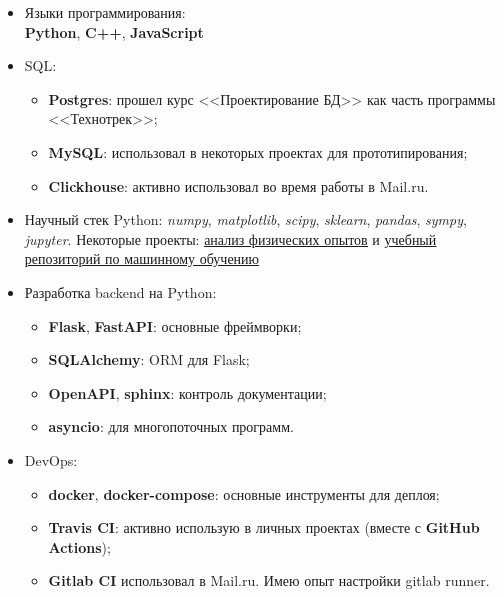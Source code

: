 \begin{itemize}
	\item Языки программирования: \\
        \textbf{Python}, \textbf{C++}, \textbf{JavaScript}
    \item SQL:
        \begin{itemize}
            \item \textbf{Postgres}: прошел курс <<Проектирование БД>> как часть программы <<Технотрек>>;
            \item \textbf{MySQL}: использовал в некоторых проектах для прототипирования;
            \item \textbf{Clickhouse}: активно использовал во время работы в Mail.ru.
        \end{itemize}
    \item Научный стек Python: \textit{numpy}, \textit{matplotlib}, \textit{scipy}, \textit{sklearn}, \textit{pandas}, \textit{sympy}, \textit{jupyter}.
    Некоторые проекты: \href{https://github.com/alekseik1/phys\_labs}{\underline{анализ физических опытов}} и \href{https://github.com/alekseik1/machine\_learning\_coursera}{\underline{учебный репозиторий по машинному обучению}}
    \item Разработка backend на Python:
        \begin{itemize}
            \item \textbf{Flask}, \textbf{FastAPI}: основные фреймворки;
            \item \textbf{SQLAlchemy}: ORM для Flask;
            \item \textbf{OpenAPI}, \textbf{sphinx}: контроль документации;
            \item \textbf{asyncio}: для многопоточных программ.
        \end{itemize}
    \item DevOps:
        \begin{itemize}
            \item \textbf{docker}, \textbf{docker-compose}: основные инструменты для деплоя;
            \item \textbf{Travis CI}: активно использую в личных проектах (вместе с \textbf{GitHub Actions});
            \item \textbf{Gitlab CI} использовал в Mail.ru.
                Имею опыт настройки gitlab runner.
        \end{itemize}
\end{itemize}

